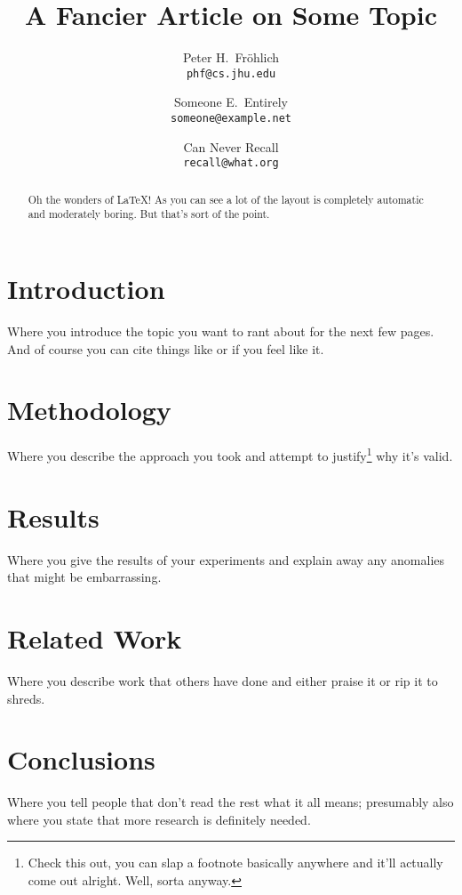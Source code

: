 \documentclass[letterpaper,12pt]{article}
\title{\textbf{A Fancier Article on Some Topic}}
\author{Peter H.\ Fr{\"o}hlich\\
\texttt{phf@cs.jhu.edu}
\and
Someone E.\ Entirely\\
\texttt{someone@example.net}
\and
Can Never Recall\\
\texttt{recall@what.org}}
\begin{document}
\maketitle

\begin{abstract}
Oh the wonders of \LaTeX!
As you can see a lot of the layout is completely
automatic and moderately boring.
But that's sort of the point.
\end{abstract}

\section{Introduction}

Where you introduce the topic you want to rant
about for the next few pages.
And of course you can cite things like
\cite{lamport94} or \cite{kant02} if you feel
like it.

\section{Methodology}

Where you describe the approach you took and
attempt to justify\footnote{Check this out,
you can slap a footnote basically anywhere
and it'll actually come out alright. Well,
sorta anyway.} why it's valid.

\section{Results}

Where you give the results of your experiments
and explain away any anomalies that might be
embarrassing.

\section{Related Work}

Where you describe work that others have done
and either praise it or rip it to shreds.

\section{Conclusions}

Where you tell people that don't read the rest
what it all means; presumably also where you
state that more research is definitely needed.
\end{document}
